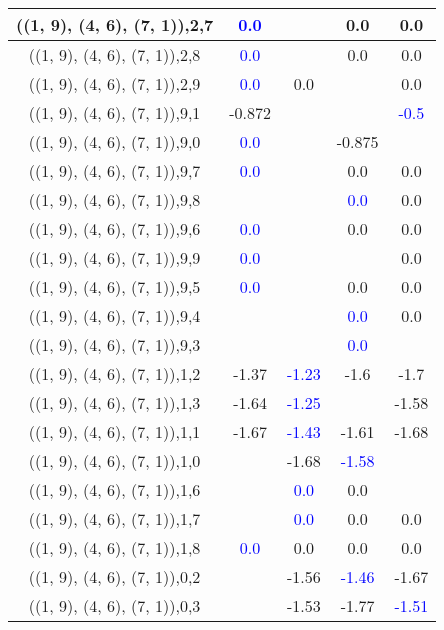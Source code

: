 \documentclass{article}
\begin{document}
\begin{center}
\begin{longtable}{|c|c|c|c|c|}
        	\hline
        	((1, 9), (4, 6), (7, 1)),2,7& \textcolor{blue}{0.0}&&0.0&0.0\\
        	\hline
        	((1, 9), (4, 6), (7, 1)),2,8& \textcolor{blue}{0.0}&&0.0&0.0\\
        	\hline
        	((1, 9), (4, 6), (7, 1)),2,9& \textcolor{blue}{0.0}&0.0&&0.0\\
        	\hline
        	((1, 9), (4, 6), (7, 1)),9,1&-0.872&&& \textcolor{blue}{-0.5}\\
        	\hline
        	((1, 9), (4, 6), (7, 1)),9,0& \textcolor{blue}{0.0}&&-0.875&\\
        	\hline
        	((1, 9), (4, 6), (7, 1)),9,7& \textcolor{blue}{0.0}&&0.0&0.0\\
        	\hline
        	((1, 9), (4, 6), (7, 1)),9,8&&& \textcolor{blue}{0.0}&0.0\\
        	\hline
        	((1, 9), (4, 6), (7, 1)),9,6& \textcolor{blue}{0.0}&&0.0&0.0\\
        	\hline
        	((1, 9), (4, 6), (7, 1)),9,9& \textcolor{blue}{0.0}&&&0.0\\
        	\hline
        	((1, 9), (4, 6), (7, 1)),9,5& \textcolor{blue}{0.0}&&0.0&0.0\\
        	\hline
        	((1, 9), (4, 6), (7, 1)),9,4&&& \textcolor{blue}{0.0}&0.0\\
        	\hline
        	((1, 9), (4, 6), (7, 1)),9,3&&& \textcolor{blue}{0.0}&\\
        	\hline
        	((1, 9), (4, 6), (7, 1)),1,2&-1.37& \textcolor{blue}{-1.23}&-1.6&-1.7\\
        	\hline
        	((1, 9), (4, 6), (7, 1)),1,3&-1.64& \textcolor{blue}{-1.25}&&-1.58\\
        	\hline
        	((1, 9), (4, 6), (7, 1)),1,1&-1.67& \textcolor{blue}{-1.43}&-1.61&-1.68\\
        	\hline
        	((1, 9), (4, 6), (7, 1)),1,0&&-1.68& \textcolor{blue}{-1.58}&\\
        	\hline
        	((1, 9), (4, 6), (7, 1)),1,6&& \textcolor{blue}{0.0}&0.0&\\
        	\hline
        	((1, 9), (4, 6), (7, 1)),1,7&& \textcolor{blue}{0.0}&0.0&0.0\\
        	\hline
        	((1, 9), (4, 6), (7, 1)),1,8& \textcolor{blue}{0.0}&0.0&0.0&0.0\\
        	\hline
        	((1, 9), (4, 6), (7, 1)),0,2&&-1.56& \textcolor{blue}{-1.46}&-1.67\\
        	\hline
        	((1, 9), (4, 6), (7, 1)),0,3&&-1.53&-1.77& \textcolor{blue}{-1.51}\\

\end{longtable}
\end{center}
\end{document}
